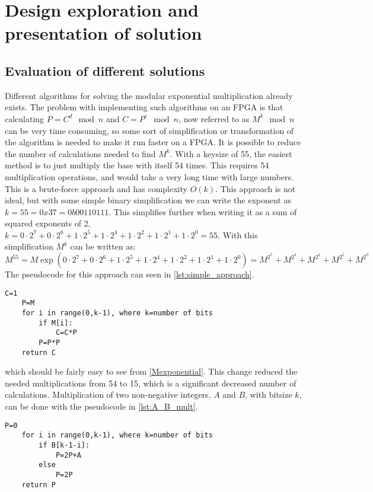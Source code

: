 \section{Design exploration and presentation of solution}
\subsection{Evaluation of different solutions}\label{sec:differentAlternatives}
Different algorithms for solving the modular exponential multiplication already exists. 
The problem with implementing such algorithms on an FPGA is that calculating $P=C^d\mod{n}$ and $C=P^e\mod{n}$, now referred to as $M^k\mod{n}$ can be very time consuming, so some sort of simplification or transformation of the algorithm is needed to make it run faster on a FPGA.
It is possible to reduce the number of calculations needed to find $M^k$. With a keysize of 55, the easiest method is to just multiply the base with itself 54 times. 
This requires 54 multiplication operations, and would take a very long time with large numbers. 
This is a brute-force approach and has complexity $O(k)$. 
This approach is not ideal, but with some simple binary simplification we can write the exponent as $k=55=0x37=0b00110111$. 
This simplifies further when writing it as a sum of squared exponents of 2, $k=0\cdot2^7 + 0\cdot2^6 + 1\cdot2^5 + 1\cdot2^4 + 1\cdot2^2 + 1\cdot2^1 + 1\cdot2^0=55$. 
With this simplification $M^k$ can be written as:
%
\begin{equation}\label{Mexponential}
    M^{55}=M\exp(0\cdot2^7 + 0\cdot2^6 + 1\cdot2^5 + 1\cdot2^4 + 1\cdot2^2 + 1\cdot2^1 + 1\cdot2^0) 
    = M^{2^5} + M^{2^4} + M^{2^2} + M^{2^1} + M^{2^0} 
\end{equation}
%
The pseudocode for this approach can seen in \cref{lst:simple_approach}.
%
\begin{lstlisting}[label=lst:simple_approach, caption=Simplified brute force exponentiation]
    C=1
    P=M
    for i in range(0,k-1), where k=number of bits
        if M[i]:
            C=C*P
        P=P*P
    return C
\end{lstlisting}
%
which should be fairly easy to see from \cref{Mexponential}. This change reduced the needed multiplications from 54 to 15, which is a significant decreased number of calculations.
Multiplication of two non-negative integers, $A$ and $B$, with bitsize $k$, can be done with the pseudocode in \cref{lst:A_B_mult}. 
%
\begin{lstlisting}[label=lst:A_B_mult, caption=Multiplication of two non-negative integers]
    P=0
    for i in range(0,k-1), where k=number of bits
        if B[k-1-i]:
            P=2P+A
        else
            P=2P
    return P
\end{lstlisting}
